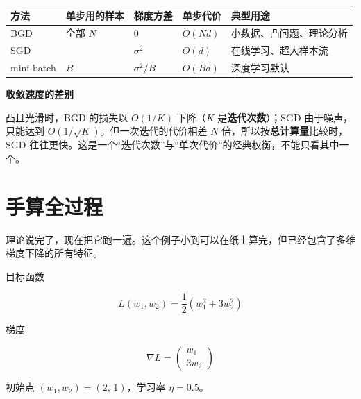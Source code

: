\documentclass[UTF8, a4paper, zihao=-4, fontset=none]{ctexart}
\begin{document}
\begin{center}
\footnotesize
\setlength{\tabcolsep}{3pt}
\begin{tabularx}{\linewidth}{@{}>{\hsize=0.833\hsize\raggedright\arraybackslash}X>{\hsize=0.972\hsize\raggedright\arraybackslash}X>{\hsize=0.694\hsize\raggedright\arraybackslash}X>{\hsize=0.694\hsize\raggedright\arraybackslash}X>{\hsize=1.807\hsize\raggedright\arraybackslash}X@{}}
\toprule
\textbf{方法} & \textbf{单步用的样本} & \textbf{梯度方差} & \textbf{单步代价} & \textbf{典型用途} \\
\midrule
BGD & 全部 $N$ & $0$ & $O(Nd)$ & 小数据、凸问题、理论分析 \\
SGD & 1 & $\sigma^2$ & $O(d)$ & 在线学习、超大样本流 \\
mini-batch & $B$ & $\sigma^2/B$ & $O(Bd)$ & 深度学习默认 \\
\bottomrule
\end{tabularx}
\end{center}



\begin{infobox}
{\bfseries\sffamily\small\color{accent} 收敛速度的差别}\par\vspace{2pt}
凸且光滑时，BGD 的损失以 $O(1/K)$ 下降（$K$ 是\textbf{迭代次数}）；SGD 由于噪声，只能达到 $O(1/\sqrt{K})$。但一次迭代的代价相差 $N$ 倍，所以按\textbf{总计算量}比较时，SGD 往往更快。这是一个“迭代次数”与“单次代价”的经典权衡，不能只看其中一个。


\end{infobox}




\section{手算全过程}



理论说完了，现在把它跑一遍。这个例子小到可以在纸上算完，但已经包含了多维梯度下降的所有特征。



目标函数


\[
L(w_1,w_2)=\frac12\left(w_1^2+3w_2^2\right)
\]


梯度


\[
\nabla L=\begin{pmatrix}w_1\\[3pt]3w_2\end{pmatrix}
\]


初始点 $(w_1,w_2)=(2,\,1)$，学习率 $\eta=0.5$。
\end{document}
